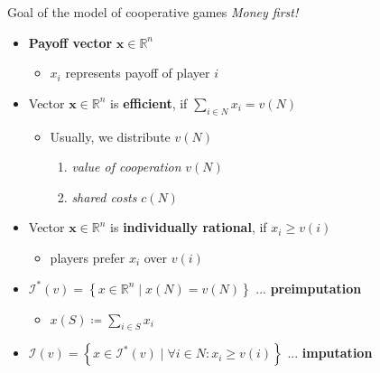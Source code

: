 \documentclass{beamer}
\newcommand{\Rn}[1][n]{\mathbb{R}^{#1}}
\newcommand{\bx}{\textbf{x}}
\newcommand{\I}{\mathcal{I}}
\begin{document}


\begin{frame}{Goal of the model of cooperative games}
	\textit{Money first!}
	\vspace{0.3in}
	\begin{itemize}
	    \item<2-> \textbf{Payoff vector} $\bx \in \Rn$
	    \begin{itemize}
	        \item<2-> $x_i$ represents payoff of player $i$
	    \end{itemize}
	    \item<3-> Vector $\bx \in \Rn$ is \textbf{efficient}, if $\sum_{i \in N}x_i = v(N)$
	    \begin{itemize}
	        \item<4-> Usually, we distribute $v(N)$
            \begin{enumerate}
                \item<4-> \textit{value of cooperation} $v(N)$
                \item<4-> \textit{shared costs} $c(N)$
            \end{enumerate}
	    \end{itemize}
	    \item<5-> Vector $\bx \in \Rn$ is \textbf{individually rational}, if $x_i \geq v(i)$
	    \begin{itemize}
	        \item<6-> players prefer $x_i$ over $v(i)$
	    \end{itemize}
	    \end{itemize}
	    \vspace{0.2in}
	    \begin{itemize}
	    \item<7-> $\I^*(v) = \left\{x \in \Rn \mid x(N) = v(N) \right\}$ ... \textbf{preimputation}
	    \begin{itemize}
	        \item<7-> $x(S)\coloneqq \sum_{i \in S} x_i$
	    \end{itemize}
	    \item<8-> $\I(v) = \left\{x \in \I^*(v) \mid \forall i \in N: x_i \geq v(i)\right\}$ ... \textbf{imputation}
	\end{itemize}
\end{frame}

\end{document}

